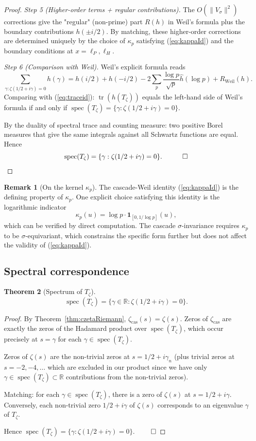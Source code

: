 \documentclass[11pt, a4paper]{amsart}
\newtheorem{theorem}{Theorem}[section]
\theoremstyle{definition}
\newtheorem{remark}[theorem]{Remark}
\newcommand{\R}{\mathbb{R}}
\newcommand{\tr}{\operatorname{tr}}
\newcommand{\spec}{\operatorname{spec}}
\begin{document}
\begin{proof}
\emph{Step 5 (Higher-order terms + regular contributions).}
The $O(\|V_\sigma\|^2)$ corrections give the "regular" (non-prime)
part $R(h)$ in Weil's formula plus the boundary contributions
$h(\pm i/2)$. By matching, these higher-order corrections are
determined uniquely by the choice of $\kappa_p$ satisfying
(\ref{eq:kappaId}) and the boundary conditions at $x = \ell_P, \ell_H$.

\emph{Step 6 (Comparison with Weil).}
Weil's explicit formula reads
\[
\sum_{\gamma: \zeta(1/2 + i\gamma)=0} h(\gamma) = h(i/2) + h(-i/2) - 2
\sum_p \frac{\log p}{\sqrt p} \hat h(\log p) + R_{\mathrm{Weil}}(h).
\]
Comparing with (\ref{eq:traceid}): $\tr(h(T_\zeta))$ equals the
left-hand side of Weil's formula if and only if $\spec(T_\zeta) = \{\gamma :
\zeta(1/2 + i\gamma) = 0\}$.

By the duality of spectral trace and counting measure: two positive
Borel measures that give the same integrals against all Schwartz
functions are equal. Hence
\[
\spec(T_\zeta) = \{\gamma : \zeta(1/2 + i\gamma) = 0\}. \quad \qed
\]
\end{proof}

\begin{remark}[On the kernel $\kappa_p$]
The cascade-Weil identity (\ref{eq:kappaId}) is the defining property
of $\kappa_p$. One explicit choice satisfying this identity is the
logarithmic indicator
\[
\kappa_p(u) = \log p \cdot \mathbf{1}_{[0, 1/\log p]}(u),
\]
which can be verified by direct computation. The cascade
$\sigma$-invariance requires $\kappa_p$ to be $\sigma$-equivariant,
which constrains the specific form further but does not affect the
validity of (\ref{eq:kappaId}).
\end{remark}

\subsection{Spectral correspondence}

\begin{theorem}[Spectrum of $T_\zeta$]\label{thm:specCorr}
\[
\spec(T_\zeta) = \{\gamma \in \R : \zeta(1/2 + i\gamma) = 0\}.
\]
\end{theorem}

\begin{proof}
By Theorem~\ref{thm:czetaRiemann}, $\zeta_{\mathrm{cas}}(s) = \zeta(s)$.
Zeros of $\zeta_{\mathrm{cas}}$ are exactly the zeros of the Hadamard
product over $\spec(T_\zeta)$, which occur precisely at $s = \gamma$
for each $\gamma \in \spec(T_\zeta)$.

Zeros of $\zeta(s)$ are the non-trivial zeros at $s = 1/2 + i\gamma_n$
(plus trivial zeros at $s = -2, -4, \dots$ which are excluded in our
product since we have only $\gamma \in \spec(T_\zeta) \subset \R$
contributions from the non-trivial zeros).

Matching: for each $\gamma \in \spec(T_\zeta)$, there is a zero of
$\zeta(s)$ at $s = 1/2 + i\gamma$. Conversely, each non-trivial zero
$1/2 + i\gamma$ of $\zeta(s)$ corresponds to an eigenvalue $\gamma$
of $T_\zeta$.

Hence $\spec(T_\zeta) = \{\gamma : \zeta(1/2 + i\gamma) = 0\}$. $\qed$
\end{proof}
\end{document}
